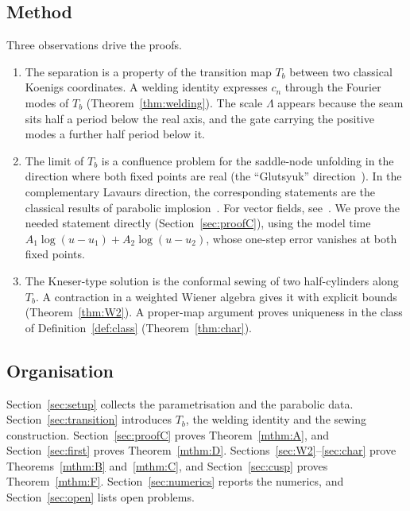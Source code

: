 \documentclass[11pt]{amsart}
\theoremstyle{definition}
\begin{document}
\subsection*{Method}
Three observations drive the proofs.
\begin{enumerate}
\item The separation is a property of the transition map $T_b$ between two
  classical Koenigs coordinates.  A welding identity expresses $c_n$ through
  the Fourier modes of $T_b$ (Theorem~\ref{thm:welding}).  The scale $\Lambda$
  appears because the seam sits half a period below the real axis, and the
  gate carrying the positive modes a further half period below it.
\item The limit of $T_b$ is a confluence problem for the saddle-node unfolding
  in the direction where both fixed points are real (the ``Glutsyuk''
  direction~\cite{Glutsyuk2001,MRR2004,ChristopherRousseau}).  In the
complementary Lavaurs direction, the corresponding statements are the classical
results of parabolic implosion~\cite{Lavaurs1989,Shishikura2000,Oudkerk1999}.
For vector fields, see~\cite{RousseauTeyssier2008}.  We prove the
  needed statement directly (Section~\ref{sec:proofC}), using the model time
  $A_1\log(u-u_1)+A_2\log(u-u_2)$, whose one-step error vanishes at both fixed
  points.
\item The Kneser-type solution is the conformal sewing of two half-cylinders
  along $T_b$.  A contraction in a weighted Wiener algebra gives it with
  explicit bounds (Theorem~\ref{thm:W2}).  A proper-map argument proves
  uniqueness in the class of Definition~\ref{def:class}
  (Theorem~\ref{thm:char}).
\end{enumerate}

\subsection*{Organisation}
Section~\ref{sec:setup} collects the parametrisation and the parabolic data.
Section~\ref{sec:transition} introduces $T_b$, the welding identity and the
sewing construction.  Section~\ref{sec:proofC} proves Theorem~\ref{mthm:A}, and
Section~\ref{sec:first} proves Theorem~\ref{mthm:D}.
Sections~\ref{sec:W2}--\ref{sec:char} prove Theorems~\ref{mthm:B}
and~\ref{mthm:C}, and Section~\ref{sec:cusp} proves Theorem~\ref{mthm:F}.
Section~\ref{sec:numerics} reports the numerics, and
Section~\ref{sec:open} lists open problems.
\end{document}
